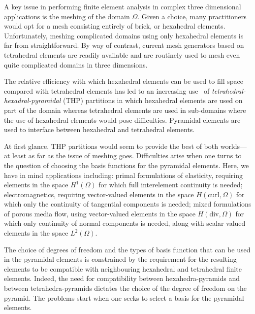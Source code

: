 \documentclass[twoside,reqno,final]{amsart}
\begin{document}
A key issue in performing finite element analysis in complex three dimensional
applications 
is the meshing of the domain $\Omega$. Given a choice, many practitioners would
opt for a mesh consisting entirely of brick, or hexahedral elements.
Unfortunately, meshing complicated domains using only hexahedral elements is
far from straightforward. By way of contrast, current mesh generators based on
tetrahedral elements are readily available and are routinely used to mesh even
quite complicated domains in three dimensions. 

The relative efficiency with which hexahedral elements can be used to fill
space compared with tetrahedral elements has led to an increasing
use~\cite{Baudouin2014,OwenSaigal01}  of \emph{tetrahedral-hexadral-pyramidal}
(THP) partitions in which hexahedral elements are used on part of the domain
whereas tetrahedral elements are used in sub-domains where the use of
hexahedral elements would pose difficulties. Pyramidal elements are used to
interface between hexahedral and tetrahedral elements.

At first glance, THP partitions would seem to provide the best of both
worlds---at least as far as the issue of meshing goes. Difficulties arise when
one turns to the question of choosing the basis functions for the pyramidal
elements. Here, we have in mind applications including: primal formulations of
elasticity, requiring elements in the space $H^1(\Omega)$ for which full
interelement continuity is needed; electromagnetics, requiring vector-valued
elements in the space $H(\mathrm{curl},\Omega)$ for which only the continuity
of tangential components is needed; mixed formulations of porous media flow,
using vector-valued elements in the space $H(\mathrm{div},\Omega)$ for which
only continuity of normal components is needed, along with scalar valued
elements in the space $L^2(\Omega)$. 

The choice of degrees of freedom and the types of basis function that can be
used in the pyramidal elements is constrained by the requirement for the
resulting elements to be compatible with neighbouring hexahedral and
tetrahedral finite elements. Indeed, the need for compatibility between
hexahedra-pyramids and between tetrahedra-pyramids dictates the choice of the
degree of freedom on the pyramid.  The problems start when one seeks to select
a basis for the pyramidal elements. 
\end{document}

